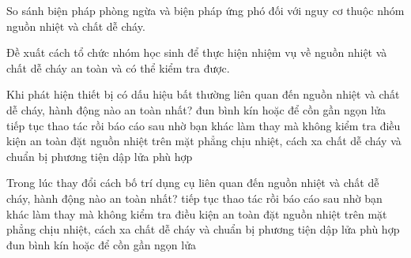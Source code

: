 \begin{bt}
So sánh biện pháp phòng ngừa và biện pháp ứng phó đối với nguy cơ thuộc nhóm nguồn nhiệt và chất dễ cháy.
\end{bt}

\begin{bt}
Đề xuất cách tổ chức nhóm học sinh để thực hiện nhiệm vụ về nguồn nhiệt và chất dễ cháy an toàn và có thể kiểm tra được.
\end{bt}

\begin{ex}
Khi phát hiện thiết bị có dấu hiệu bất thường liên quan đến nguồn nhiệt và chất dễ cháy, hành động nào an toàn nhất?
\choice
{đun bình kín hoặc để cồn gần ngọn lửa}
{tiếp tục thao tác rồi báo cáo sau}
{nhờ bạn khác làm thay mà không kiểm tra điều kiện an toàn}
{\True đặt nguồn nhiệt trên mặt phẳng chịu nhiệt, cách xa chất dễ cháy và chuẩn bị phương tiện dập lửa phù hợp}
\end{ex}

\begin{ex}
Trong lúc thay đổi cách bố trí dụng cụ liên quan đến nguồn nhiệt và chất dễ cháy, hành động nào an toàn nhất?
\choice
{tiếp tục thao tác rồi báo cáo sau}
{nhờ bạn khác làm thay mà không kiểm tra điều kiện an toàn}
{\True đặt nguồn nhiệt trên mặt phẳng chịu nhiệt, cách xa chất dễ cháy và chuẩn bị phương tiện dập lửa phù hợp}
{đun bình kín hoặc để cồn gần ngọn lửa}
\end{ex}

